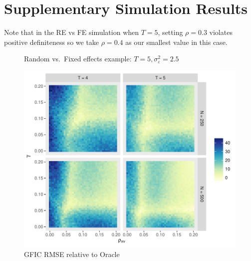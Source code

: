 \section{Supplementary Simulation Results}
\label{sec:simulation_supplement}

Note that in the RE vs FE simulation when $T=5$, setting $\rho = 0.3$ violates positive definiteness so we take $\rho=0.4$ as our smallest value in this case.
\begin{figure}[htbp]
  \centering
  
  \caption{Random vs.\ Fixed effects example: $T=5, \sigma_{\varepsilon}^2 = 2.5$}
  \label{fig:REvsFE_T5}
\end{figure}
\begin{figure}
\centering
\includegraphics[scale = 0.8]{./simulations/DynamicPanel/results/Dpanel_GFIC_RMSE_rel_oracle}
\caption{GFIC RMSE relative to Oracle}
\end{figure}

